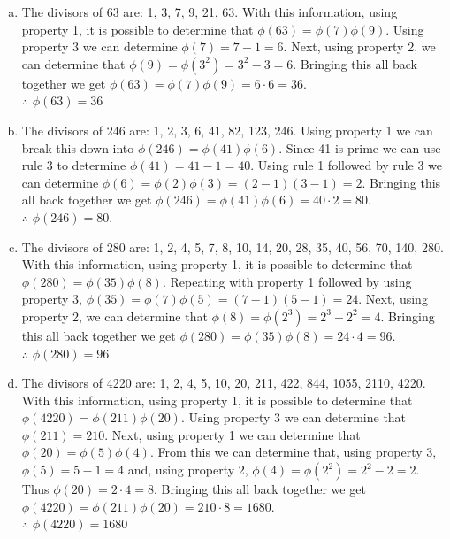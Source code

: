 \documentclass[fleqn, 12pt]{article}
\begin{document}
\begin{enumerate}[a)]
    \item
        The divisors of 63 are: 1, 3, 7, 9, 21, 63. With this information, using property 1, it is possible to determine that $\phi(63) = \phi(7)\phi(9)$. Using property 3 we can determine $\phi(7) = 7-1 = 6$. Next, using property 2, we can determine that $\phi(9)=\phi(3^2)=3^2-3=6$. Bringing this all back together we get $\phi(63) = \phi(7) \phi(9) = 6 \cdot 6 = 36$.\\

        $\therefore$ $\phi(63) = 36$
    \item
        The divisors of 246 are: 1, 2, 3, 6, 41, 82, 123, 246. Using property 1 we can break this down into $\phi(246) = \phi(41) \phi(6)$. Since 41 is prime we can use rule 3 to determine $\phi(41) = 41 - 1 = 40$. Using rule 1 followed by rule 3 we can determine $\phi(6)=\phi(2)\phi(3)=(2-1)(3-1)=2$. Bringing this all back together we get $\phi(246) = \phi(41)\phi(6) = 40 \cdot 2 = 80$.\\

        $\therefore$ $\phi(246)=80$.
    \item
        The divisors of 280 are: 1, 2, 4, 5, 7, 8, 10, 14, 20, 28, 35, 40, 56, 70, 140, 280. With this information, using property 1, it is possible to determine that $\phi(280) = \phi(35) \phi(8)$. Repeating with property 1 followed by using property 3, $\phi(35)=\phi(7)\phi(5)=(7-1)(5-1)=24$. Next, using property 2, we can determine that $\phi(8)=\phi(2^3)=2^3 - 2^2 = 4$. Bringing this all back together we get $\phi(280) = \phi(35) \phi(8) = 24 \cdot 4 = 96$.\\

        $\therefore$ $\phi(280) = 96$
    \item
        The divisors of 4220 are: 1, 2, 4, 5, 10, 20, 211, 422, 844, 1055, 2110, 4220. With this information, using property 1, it is possible to determine that $\phi(4220) = \phi(211) \phi(20)$. Using property 3 we can determine that $\phi(211) = 210$. Next, using property 1 we can determine that $\phi(20)=\phi(5)\phi(4)$. From this we can determine that, using property 3, $\phi(5)=5-1=4$ and, using property 2, $\phi(4)=\phi(2^2)=2^2-2=2$. Thus $\phi(20)=2 \cdot 4 = 8$. Bringing this all back together we get $\phi(4220) = \phi(211) \phi(20) = 210 \cdot 8 = 1680$.\\

        $\therefore$ $\phi(4220) = 1680$
\end{enumerate}
\end{document}
